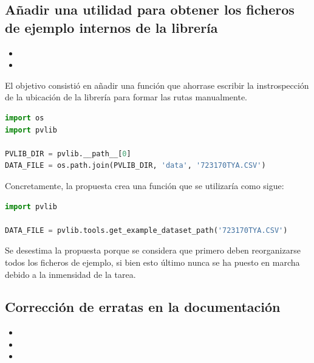 \subsection{Añadir una utilidad para obtener los ficheros de ejemplo internos de la librería}

\begin{itemize}
    \item {}
    \item {}
\end{itemize}

El objetivo consistió en añadir una función que ahorrase escribir la instrospección de la ubicación de la librería para formar las rutas manualmente.

\begin{lstlisting}[language=python, caption={Fragmento de código utilizado normalmente para obtener la ruta de los ficheros de la librería}, label={lst:example_files_current}]
import os
import pvlib

PVLIB_DIR = pvlib.__path__[0]
DATA_FILE = os.path.join(PVLIB_DIR, 'data', '723170TYA.CSV')
\end{lstlisting}

Concretamente, la propuesta crea una función que se utilizaría como sigue:

\begin{lstlisting}[language=python, caption={Fragmento de código utilizando la función propuesta para obtener la ruta de los ficheros de la librería}, label={lst:example_files_proposal}]
import pvlib

DATA_FILE = pvlib.tools.get_example_dataset_path('723170TYA.CSV')
\end{lstlisting}

Se desestima la propuesta porque se considera que primero deben reorganizarse todos los ficheros de ejemplo, si bien esto último nunca se ha puesto en marcha debido a la inmensidad de la tarea.

\subsection{Corrección de erratas en la documentación}

\begin{itemize}
    \item {}
    \item {}
    \item {}
\end{itemize}

